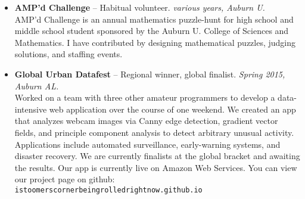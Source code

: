 \documentclass[11pt]{article}
\begin{document}
{\begin{itemize}
        Auburn University annually hosts the regional Science Olympiad.
        I have contributed by staffing events.
    \item{}
      {\bf AMP'd Challenge} --
      {Habitual volunteer.}
      {\em various years, Auburn U.}\\
        AMP'd Challenge is an annual mathematics puzzle-hunt for high
        school and middle school student sponsored by the Auburn U.
        College of Sciences and Mathematics. I have contributed by
        designing mathematical puzzles, judging solutions, and staffing
        events.
    \item{}
      {\bf Global Urban Datafest} --
      {Regional winner, global finalist.}
      {\em Spring 2015, Auburn AL.}\\
        Worked on a team with three other amateur programmers to develop
        a data-intensive web application over the course of one weekend.
        We created an app that analyzes webcam images via Canny edge
        detection, gradient vector fields, and principle component
        analysis to detect arbitrary unusual activity. Applications
        include automated surveillance, early-warning systems, and
        disaster recovery. We are currently finalists at the global
        bracket and awaiting the results. Our app is currently live on
        Amazon Web Services. You can view our project page on github:
        {\tt istoomerscornerbeingrolledrightnow.github.io}
  \end{itemize}
}

\label{page:last}
\end{document}
